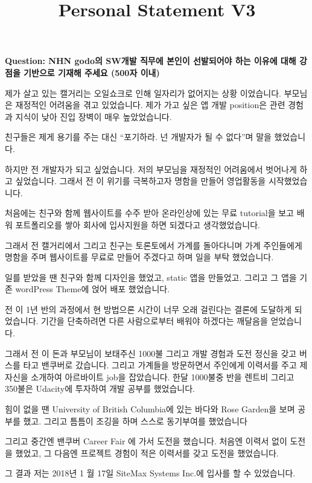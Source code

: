 \documentclass[12pt]{article}
\begin{document}
\title{Personal Statement V3}
\maketitle

\textbf{Question: NHN godo의 SW개발 직무에 본인이 선발되어야 하는 이유에 대해 강점을 기반으로 기재해 주세요 (500자 이내)}

\bigskip

제가 살고 있는 캘거리는 오일쇼크로 인해 일자리가 없어지는 상황 이었습니다. 부모님은 재정적인 어려움을 겪고 있었습니다. 제가 가고 싶은 앱 개발 position은 관련 경험과 지식이 낮아 진입 장벽이 매우 높았었습니다.

친구들은 제게 용기를 주는 대신 “포기하라. 넌 개발자가 될 수 없다”며 말을 했었습니다.

하지만 전 개발자가 되고 싶었습니다. 저의 부모님을 재정적인 어려움에서 벗어나게 하고 싶었습니다. 그래서 전 이 위기를 극복하고자 명함을 만들어 영업활동을 시작했었습니다.

처음에는 친구와 함께 웹사이트를 수주 받아 온라인상에 있는 무료 tutorial을 보고 배워 포트폴리오를 쌓아 회사에 입사지원을 하면 되겠다고 생각했었습니다.

그래서 전 캘거리에서 그리고 친구는 토론토에서 가계를 돌아다니며 가계 주인들에게 명함을 주며 웹사이트를 무료로 만들어 주겠다고 하며 일을 부탁 했었습니다.

일를 받았을 땐 친구와 함께 디자인을 했었고, static 앱을 만들었고. 그리고 그 앱을 기존 wordPress Theme에 얹어 배포 했었습니다.

전 이 1년 반의 과정에서 현 방법으론 시간이 너무 오래 걸린다는 결론에 도달하게 되었습니다. 기간을 단축하려면 다른 사람으로부터 배워야 하겠다는 깨달음을 얻었습니다.

그래서 전 이 돈과 부모님이 보태주신 1000불 그리고 개발 경험과 도전 정신을 갖고 버스를 타고 밴쿠버로 갔습니다.
그리고 가계들을 방문하면서 주인에게 이력서를 주고 제 자신을 소개하여 아르바이트 job을 잡았습니다.
한달 1000불중 반을 렌트비 그리고 350불은 Udacity에 투자하여 개발 공부를 했었습니다.

힘이 없을 땐 University of British Columbia에 있는 바다와 Rose Garden을 보며 공부를 했고. 그리고 틈틈이 조깅을 하며 스스로 동기부여를 했었습니다

그리고 중간엔 밴쿠버 Career Fair 에 가서 도전을 했습니다. 처음엔 이력서 없이 도전을 했었고, 그 다음엔 프로젝트 경험이 적은 이력서를 갖고 도전을 했었습니다.

그 결과 저는 2018년 1 월 17일 SiteMax Systems Inc.에 입사를 할 수 있었습니다.
\end{document}
